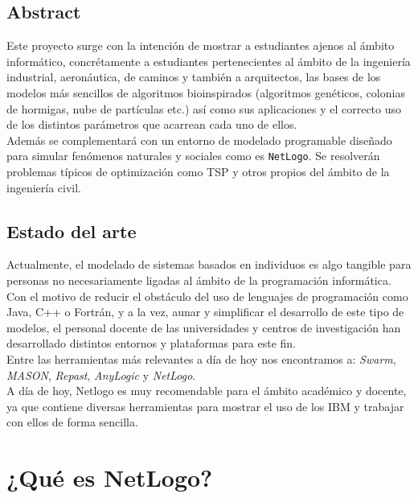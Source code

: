 \documentclass[a4paper,12pt]{report}
\begin{document}
\clearpage

\section{Abstract}

Este proyecto surge con la intención de mostrar a estudiantes ajenos al ámbito informático,
concrétamente a estudiantes pertenecientes al ámbito de la ingeniería industrial, aeronáutica, de caminos y también a arquitectos, las bases de los modelos más sencillos de algoritmos bioinspirados (algoritmos genéticos, colonias de hormigas, nube de partículas etc.) así como sus aplicaciones y el correcto uso de los distintos parámetros que acarrean cada uno de ellos.
\vspace{4mm}\\
Además se complementará con un entorno de modelado programable diseñado para simular fenómenos naturales y sociales como es \texttt{NetLogo}. Se resolverán problemas típicos de optimización como TSP y otros propios del ámbito de la ingeniería civil.

\vspace{2cm}

\section{Estado del arte}

Actualmente, el modelado de sistemas basados en individuos es algo tangible para personas no necesariamente ligadas al ámbito de la programación informática.
\vspace{2mm}\\
Con el motivo de reducir el obstáculo del uso de lenguajes de programación como Java, C++ o Fortrán, y a la vez, aunar y simplificar el desarrollo de este tipo de modelos, el personal docente de las universidades y centros de investigación han desarrollado distintos entornos y plataformas para este fin.
\vspace{2mm}\\
Entre las herramientas más relevantes a día de hoy nos encontramos a: \textit{Swarm}, \textit{MASON}, \textit{Repast}, \textit{AnyLogic} y  \textit{NetLogo}. 
\vspace{2mm}\\
A día de hoy, Netlogo es muy recomendable para el ámbito académico y docente, ya que contiene diversas herramientas para mostrar el uso de los IBM y trabajar con ellos de forma sencilla.


\chapter{¿Qué es NetLogo?}
\end{document}
